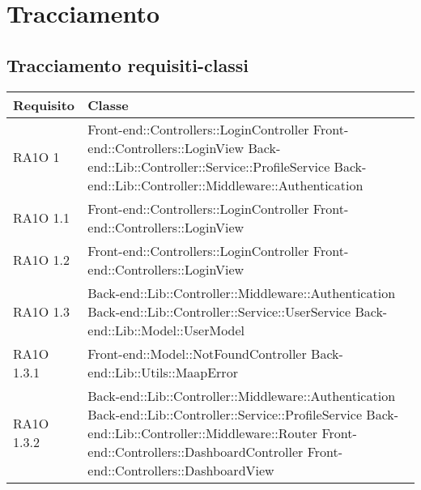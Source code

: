 \section{Tracciamento}
\subsection{Tracciamento requisiti-classi}

\begin{center}
      \bgroup
      \def\arraystretch{1.8}
      \begin{longtable}{ | p{3cm} | p{11cm} | }
    \hline
    
      \cellcolor[gray]{0.9} \textbf{Requisito} & \cellcolor[gray]{0.9} \textbf{Classe} \\ \hline
      
	RA1O 1 & Front-end::Controllers::LoginController \newline Front-end::Controllers::LoginView \newline 
			Back-end::Lib::Controller::Service::ProfileService \newline
			Back-end::Lib::Controller::Middleware::Authentication\\ \hline 
			
	RA1O 1.1 & Front-end::Controllers::LoginController \newline Front-end::Controllers::LoginView \\ \hline 
	RA1O 1.2 & Front-end::Controllers::LoginController \newline Front-end::Controllers::LoginView \\ \hline      

	RA1O 1.3 & Back-end::Lib::Controller::Middleware::Authentication  \newline 
			Back-end::Lib::Controller::Service::UserService \newline 
			Back-end::Lib::Model::UserModel  \newline \\ \hline  
    
    RA1O 1.3.1 & Front-end::Model::NotFoundController \newline Back-end::Lib::Utils::MaapError  \newline \\ \hline 
           
    RA1O 1.3.2 & Back-end::Lib::Controller::Middleware::Authentication \newline
        			Back-end::Lib::Controller::Service::ProfileService \newline
        			Back-end::Lib::Controller::Middleware::Router \newline
        			Front-end::Controllers::DashboardController \newline
        			Front-end::Controllers::DashboardView  \newline  \\ \hline 
        				

\end{longtable}
\end{center}

